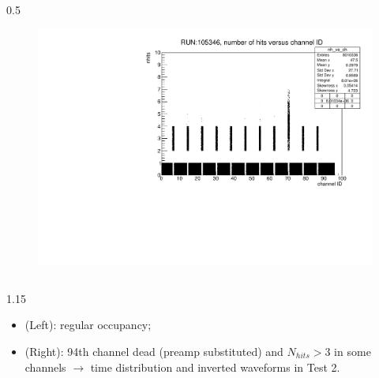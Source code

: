 \documentclass{beamer}
\begin{document}
\begin{frame}
\begin{columns}
\begin{column}{0.5\framewidth}
     \begin{figure}[!h]
      \centering
      \vspace{-3mm}
      \includegraphics[width=\columnwidth]{figures/pdf/run105346_nh_vs_ch.pdf}
     \label{fig:normalhits}
\end{figure}
 \end{column}
\end{columns}
 \vspace{-10mm}
 \begin{columns}
 \begin{column}{1.15\framewidth}
     \setlength{\leftmargini}{1.1em}
 \begin{itemize}
 \item (Left): regular occupancy;
    \item (Right): 94th channel dead (preamp substituted) and $N_{hits}>3$ in some channels $\rightarrow$ time distribution and inverted waveforms in Test 2.
    \end{itemize}
     \end{column}
\end{columns}
\end{frame}
\end{document}
